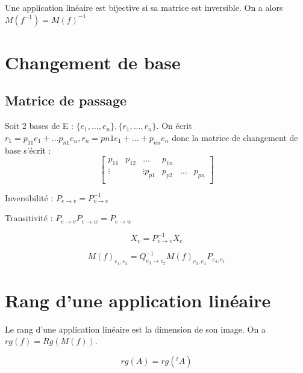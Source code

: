 \documentclass[french]{yLectureNote}
\begin{document}
\begin{proposition}
Une application linéaire est bijective si sa matrice est inversible. On a alors \(M(f^{-1}) = M(f)^{-1}\)
\end{proposition}
\section{Changement de base}
\subsection{Matrice de passage}
\begin{definition}
Soit 2 bases de E : \(\{e_1,\dots, e_n\}, \{r_1,\dots, r_n\}\). On écrit \(r_1 = p_{11}e_1+\dots p_{n1}e_n, r_n = p{n1}e_1+\dots+p_{nn}e_n\) donc la matrice de changement de base s'écrit :
\[\begin{bmatrix}
p_{11}&p_{12}&\dots& p_{1n}\\
\vdots & &\vdots
p_{p1}&p_{p2}&\dots& p_{pn}\\
\end{bmatrix}\]
\end{definition}
\begin{proposition}
Inversibilité : \(P_{e\to v} = P_{v\to e}^{-1}\)

Transitivité : \(P_{e\to v}P_{v\to w} = P_{e\to w}\)
\end{proposition}
\begin{proposition}
\[X_v = P_{e\to v}^{-1}X_e\]
\end{proposition}
\begin{proposition}
\[M(f)_{e_1, e_2} = Q_{e_3\to e_2}^{-1}M(f)_{e_3,e_4}P_{e_4, e_1}\]
\end{proposition}
\section{Rang d'une application linéaire}
\begin{proposition}
Le rang d'une application linéaire est la dimension de son image. On a \(rg(f) = Rg(M(f))\).
\end{proposition}
\begin{proposition}
\[rg(A) = rg(^tA)\]
\end{proposition}
\end{document}
